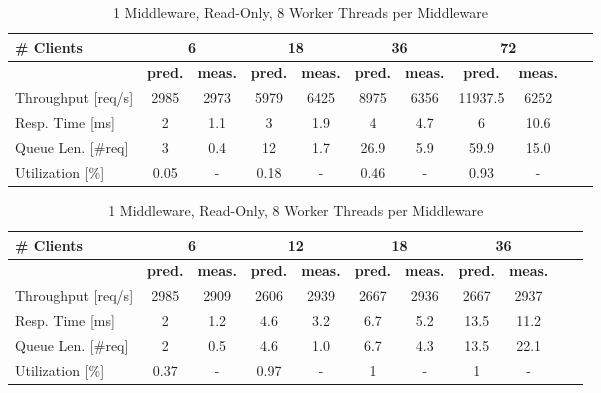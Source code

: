 \documentclass[11pt,a4paper]{article}
\begin{document}
\begin{table}
    \begin{subtable}{1.0\linewidth}\centering
        \begin{tabular}{|l|c|c|c|c|c|c|c|c|c|c|}
        \hline
        \textbf{\# Clients} & \multicolumn{2}{|c|}{\textbf{6}}  & \multicolumn{2}{|c|}{\textbf{18}} & \multicolumn{2}{|c|}{\textbf{36}} & \multicolumn{2}{|c|}{\textbf{72}}\\
        \hline
         & \textbf{pred.} & \textbf{meas.} &  \textbf{pred.} & \textbf{meas.} &  \textbf{pred.} & \textbf{meas.} &  \textbf{pred.} & \textbf{meas.} \\
        \hline
        Throughput [req/s] & 2985 & 2973 & 5979 & 6425 & 8975 & 6356 &  11937.5 & 6252\\
        Resp. Time [ms] & 2 & 1.1 & 3 & 1.9 & 4 & 4.7 & 6 & 10.6\\
        Queue Len. [\#req]& 3 & 0.4 & 12 & 1.7 & 26.9 & 5.9 & 59.9 & 15.0\\
        Utilization [\%] & 0.05 & - & 0.18 & - & 0.46 & - & 0.93 & -\\
        \hline
        \end{tabular}
    \caption{1 Middleware, Write-Only, 64 Worker Threads per Middleware}
    \end{subtable}

    \begin{subtable}{1.0\linewidth}\centering
        \begin{tabular}{|l|c|c|c|c|c|c|c|c|c|c|}
        \hline
        \textbf{\# Clients} & \multicolumn{2}{|c|}{\textbf{6}}  & \multicolumn{2}{|c|}{\textbf{12}} & \multicolumn{2}{|c|}{\textbf{18}} & \multicolumn{2}{|c|}{\textbf{36}}\\
        \hline
         & \textbf{pred.} & \textbf{meas.} &  \textbf{pred.} & \textbf{meas.} &  \textbf{pred.} & \textbf{meas.} &  \textbf{pred.} & \textbf{meas.} \\
        \hline
        Throughput [req/s] & 2985 & 2909 & 2606 & 2939 & 2667 & 2936 & 2667 & 2937\\
        Resp. Time [ms]  & 2 & 1.2 & 4.6 & 3.2 & 6.7 & 5.2 & 13.5 & 11.2\\
        Queue Len. [\#req] & 2 & 0.5 & 4.6 & 1.0 & 6.7 & 4.3 & 13.5 & 22.1\\
        Utilization [\%] & 0.37 & - & 0.97 & - & 1 & - & 1 & -\\
        \hline
        \end{tabular}
    \caption{1 Middleware, Read-Only, 8 Worker Threads per Middleware }
    \end{subtable}



\end{table}
\end{document}
